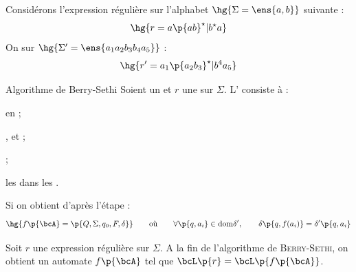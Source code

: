     \begin{example}{}{}
        Considérons l'expression régulière  sur l'alphabet $\hg{\Sigma = \ens{a, b}}$ suivante :
        \[ \hg{r = a\p{ab}^\star \vert b^\star a}\]
        On  sur $\hg{\Sigma' = \ens{a_1a_2b_3b_4a_5}}$ :
        \[ \hg{r' = a_1\p{a_2b_3}^\star \vert b^4a_5 } \]
    \end{example}
    
    \begin{form}{Algorithme de Berry-Sethi}{}
        Soient \hg{$\Sigma$} un  et $r$ une  sur $\Sigma$. L' consiste à :
        
        \begin{psse}
            \item {} en  ;
            
            \item {},  et  ;
            
            \item {} ;
            
            \item {} les  dans les .
        \end{psse}
    \end{form}
    
    \begin{notation}
        Si  on obtient d'après l'étape  : 
        \[ \hg{f\p{\bcA} = \p{Q,\Sigma,q_0,F,\delta}} \qquad\text{où}\qquad \forall \p{q, a_i} \in \mathrm{dom}{\delta'},\qquad \delta\p{q,f(a_i)} = \delta'\p{q,a_i}\]
    \end{notation}
    
    \begin{theorem}{}{}
        Soit $r$ une expression régulière sur $\Sigma$. A la fin de l'algorithme de \textsc{Berry-Sethi}, on obtient un automate $f\p{\bcA}$ tel que $\bcL\p{r} = \bcL\p{f\p{\bcA}}$.
    \end{theorem}
    
